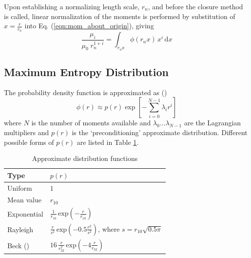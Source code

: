 \documentclass[a4paper,10pt]{article}
\begin{document}
Upon establishing a normalizing length scale, $r_n$, and before the closure method is called, linear normalization of the moments is performed by substitution of $x = \frac{r}{r_{n}}$ into Eq. (\ref{eqn:mom_about_origin}), giving
\begin{equation}
 \frac{\mu_{i}}{\mu_0 \; r_{n}^{1+i}} = \int_{r_n x} \phi(r_n x)\, x^{i}\, \mathrm{d}x
\end{equation}



\subsection{Maximum Entropy Distribution}\label{ssec:max_ent_mthd}
The probability density function is approximated as (\cite{woodbury2004})
\begin{equation}\label{eqn:phi_max_ent}
\phi(r) \approx p(r) \exp \left[- \sum^{N-1}_{i = 0} \lambda_{i} r^{i} \right]
\end{equation}
where $N$ is the number of moments available and $\lambda_{0} \ldots \lambda_{N-1}$ are the Lagrangian multipliers and $p(r)$ is the `preconditioning' approximate distribution. Different possible forms of $p(r)$ are listed in Table \ref{tab:precond}.
\begin{table}[ht]
\caption{Approximate distribution functions}
\vspace{2mm}
\centering
\begin{tabular}{l | l}
\hline \hline
Type & $p(r)$ \\
\hline
Uniform & $1$ \\
Mean value & $r_{10}$ \\
Exponential & $\frac{1}{r_{10}} \, \mathrm{exp}\left(-\frac{r}{r_{10}}\right) $ \\
Rayleigh & $\frac{r}{s^2} \, \mathrm{exp}\left(-0.5\frac{r^2}{s^2}\right)$, where $s=r_{10}\sqrt{0.5\pi}$ \\
Beck (\cite{beck2000}) & $16 \, \frac{r}{r_{32}^2} \, \mathrm{exp}\left(-4\frac{r}{r_{32}}\right)$
\end{tabular}
\label{tab:precond}
\end{table}
\end{document}
